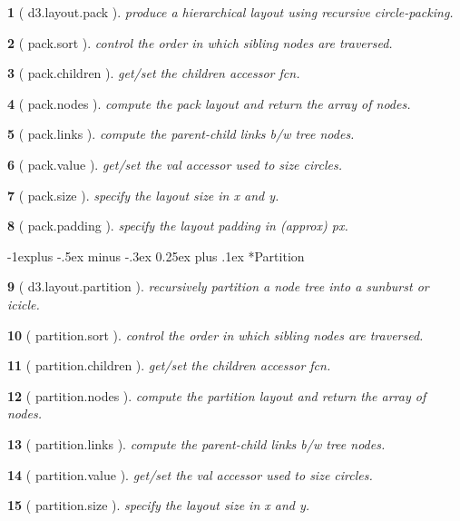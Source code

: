 \documentclass[10pt,landscape,letterpaper]{article}
\makeatletter
\newcounter{thm}
\newcommand{\hdrule}{\vspace{-4pt} \hdashrule[0.25ex]{\fill}{.5pt}{1pt}\vspace{-4pt}}
\theoremstyle{mytheoremstyle}
\newtheorem*{thm}{}
\renewcommand{\subsection}{\@startsection{subsection}{2}{0mm}%
                                {-1explus -.5ex minus -.3ex}%
                                {0.25ex plus .1ex}%
                                {\normalfont\normalsize\bfseries}}
\makeatother
\begin{document}
\begin{multicols}{3}
\begin{thm} [ d3.layout.pack ]  produce a hierarchical layout using recursive circle-packing.
\end{thm}\begin{thm} [ pack.sort ]  control the order in which sibling nodes are traversed.
\end{thm}\begin{thm} [ pack.children ]  get/set the children accessor fcn.
\end{thm}\begin{thm} [ pack.nodes ]  compute the pack layout and return the array of nodes.
\end{thm}\begin{thm} [ pack.links ]  compute the parent-child links b/w tree nodes.
\end{thm}\begin{thm} [ pack.value ]  get/set the val accessor used to size circles.
\end{thm}\begin{thm} [ pack.size ]  specify the layout size in x and y.
\end{thm}\begin{thm} [ pack.padding ]  specify the layout padding in (approx) px.\end{thm}
\hdrule
\subsection*{Partition}

\begin{thm} [ d3.layout.partition ]  recursively partition a node tree into a sunburst or icicle.
\end{thm}\begin{thm} [ partition.sort ]  control the order in which sibling nodes are traversed.
\end{thm}\begin{thm} [ partition.children ]  get/set the children accessor fcn.
\end{thm}\begin{thm} [ partition.nodes ]  compute the partition layout and return the array of nodes.
\end{thm}\begin{thm} [ partition.links ]  compute the parent-child links b/w tree nodes.
\end{thm}\begin{thm} [ partition.value ]  get/set the val accessor used to size circles.
\end{thm}\begin{thm} [ partition.size ]  specify the layout size in x and y.\end{thm}
\hdrule

\end{multicols}
\end{document}
